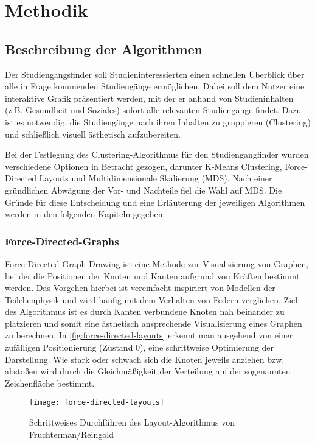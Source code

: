\section{Methodik}\label{sec:methodik}
\subsection{Beschreibung der Algorithmen}
Der Studiengangsfinder soll Studieninteressierten einen schnellen Überblick über
alle in Frage kommenden Studiengänge ermöglichen.  Dabei soll dem Nutzer eine
interaktive Grafik präsentiert werden, mit der er anhand von Studieninhalten
(z.B. \glqq Gesundheit und Soziales\grqq{}) sofort alle relevanten Studiengänge
findet. Dazu ist es notwendig, die Studiengänge nach ihren Inhalten zu
gruppieren (Clustering) und schließlich visuell ästhetisch aufzubereiten.

Bei der Festlegung des Clustering-Algorithmus für den Studiengangfinder wurden
verschiedene Optionen in Betracht gezogen, darunter K-Means Clustering,
Force-Directed Layouts und Multidimensionale Skalierung (MDS). Nach einer
gründlichen Abwägung der Vor- und Nachteile fiel die Wahl auf MDS. Die Gründe
für diese Entscheidung und eine Erläuterung der jeweiligen Algorithmen werden in
den folgenden Kapiteln gegeben.

\subsubsection{Force-Directed-Graphs}
Force-Directed Graph Drawing ist eine Methode zur Visualisierung von Graphen,
bei der die Positionen der Knoten und Kanten aufgrund von Kräften bestimmt
werden. Das Vorgehen hierbei ist vereinfacht inspiriert von Modellen der
Teilchenphysik und wird häufig mit dem Verhalten von Federn verglichen. Ziel des
Algorithmus ist es durch Kanten verbundene Knoten nah beinander zu platzieren
und somit eine ästhetisch ansprechende Visualisierung eines Graphen zu
berechnen. In \autoref{fig:force-directed-layouts} erkennt man ausgehend von
einer zufälligen Positionierung (Zustand 0), eine schrittweise Optimierung der
Darstellung. Wie stark oder schwach sich die Knoten jeweils
\glqq anziehen\grqq{} bzw. \glqq abstoßen\grqq{} wird durch die Gleichmäßigkeit
der Verteilung auf der sogenannten Zeichenfläche bestimmt.
\parencite{force-directed-layouts}

\begin{figure}[H]
    \centering
    \texttt{[image: force-directed-layouts]}
    \caption{Schrittweises Durchführen des Layout-Algorithmus von Fruchterman/Reingold}
    \label{fig:force-directed-layouts}
\end{figure}

